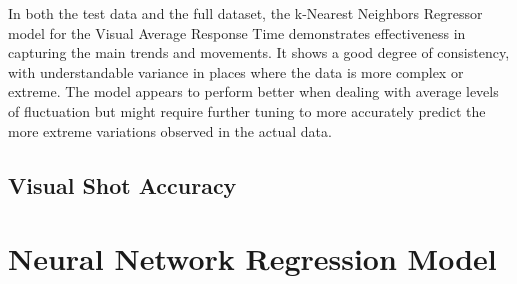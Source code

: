 In both the test data and the full dataset, the k-Nearest Neighbors Regressor model for the Visual Average Response Time demonstrates effectiveness in capturing the main trends and movements.
It shows a good degree of consistency, with understandable variance in places where the data is more complex or extreme. The model appears to perform better when dealing with average levels of 
fluctuation but might require further tuning to more accurately predict the more extreme variations observed in the actual data.


\subsection*{Visual Shot Accuracy}




\section{Neural Network Regression Model}



